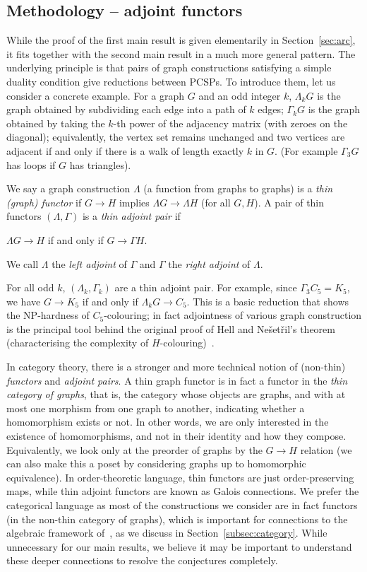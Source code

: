 \documentclass[11pt,a4paper]{scrartcl}
\numberwithin{theorem}{section}
\theoremstyle{definition}
\begin{document}
\subsection{Methodology -- adjoint functors}

While the proof of the first main result is given elementarily in Section~\ref{sec:arc}, it fits together with the second main result in a much more general pattern.
The underlying principle is that pairs of graph constructions satisfying a simple duality condition give reductions between PCSPs.
To introduce them, let us consider a concrete example.
For a graph $G$ and an odd integer $k$, $\Lambda_k G$ is the graph obtained by subdividing each edge into a path of $k$ edges;
$\Gamma_k G$ is the graph obtained by taking the $k$-th power of the adjacency matrix (with zeroes on the diagonal); equivalently, the vertex set remains unchanged and two vertices are adjacent if and only if there is a walk of length exactly $k$ in $G$.
(For example $\Gamma_3 G$ has loops if $G$ has triangles).

We say a graph construction $\Lambda$ (a function from graphs to graphs) is a \emph{thin (graph) functor}
if $G\to H$ implies $\Lambda G \to \Lambda H$ (for all $G,H$).
A pair of thin functors $(\Lambda,\Gamma)$ is a \emph{thin adjoint pair} if
\begin{center}
	$\Lambda G \to H$ if and only if $G \to \Gamma H$.
\end{center}
We call $\Lambda$ the \emph{left adjoint} of $\Gamma$ and $\Gamma$ the \emph{right adjoint} of $\Lambda$.

For all odd $k$, $(\Lambda_k,\Gamma_k)$ are a thin adjoint pair.
For example, since $\Gamma_3 C_5 = K_5$, we have $G \to K_5$ if and only if $\Lambda_k G \to C_5$.
This is a basic reduction that shows the NP-hardness of $C_5$-colouring; in
fact adjointness of various graph construction is the principal tool behind the
original proof of Hell and Ne\v{s}et\v{r}il's theorem (characterising the complexity of
$H$-colouring)~\cite{HellN90}.

In category theory, there is a stronger and more technical notion of (non-thin) \emph{functors} and \emph{adjoint pairs}.
A thin graph functor is in fact a functor in the \emph{thin category of graphs}, that is, the category whose objects are graphs,
and with at most one morphism from one graph to another, indicating whether a homomorphism exists or not.
In other words, we are only interested in the existence of homomorphisms, and not in their identity and how they compose.
Equivalently, we look only at the preorder of graphs by the $G \to H$ relation (we can also make this a poset by considering graphs up to homomorphic equivalence).
In order-theoretic language, thin functors are just order-preserving maps, while thin adjoint functors are known as Galois connections.
We prefer the categorical language as most of the constructions we consider are in fact functors (in the non-thin category of graphs), which is important for connections to the algebraic framework of~\cite{BulinKO18}, as we discuss in Section~\ref{subsec:category}.
While unnecessary for our main results, we believe it may be important to understand these deeper connections to resolve the conjectures completely.
\end{document}
